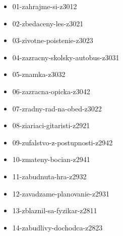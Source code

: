 



\begin{itemize}
\item 01-zahrajme-si-z3012
\item 02-zbedaceny-les-z3021
\item 03-zivotne-poistenie-z3023
\item 04-zazracny-skolsky-autobus-z3031
\item 05-znamka-z3032
\item 06-zazracna-opicka-z3042
\item 07-zradny-rad-na-obed-z3022
\item 08-ziariaci-gitaristi-z2921
\item 09-zufalstvo-z-postupnosti-z2942
\item 10-zmateny-bocian-z2941
\item 11-zabudnuta-hra-z2932
\item 12-zavadzame-planovanie-z2931
\item 13-zblaznil-sa-fyzikar-z2811
\item 14-zabudlivy-dochodca-z2823
\end{itemize}

